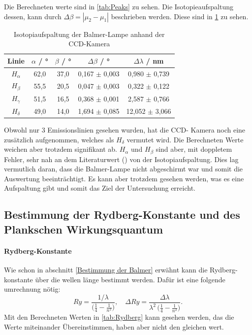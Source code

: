 Die Berechneten werte sind in \cref{tab:Peaks} zu sehen.
Die Isotopieaufspaltung dessen, kann durch 
$\Delta\beta = |\mu_2 - \mu_1|$
beschrieben werden. 
Diese sind in \cref{tab:Isotopiaufspaltung} zu sehen.
\begin{table}[htbp]
    \centering
    \begin{tabular}{|c|c|c|c|c|}
        Linie & $\alpha$ / ° & $\beta$ / ° & $\Delta\beta$ / ° & $\Delta\lambda$ / nm \\
        \hline
        $H_\alpha$& 62,0 & 37,0 & 0,167 $\pm$ 0,003 & 0,980 $\pm$ 0,739 \\
        $H_\beta$ & 55,5 & 20,5 & 0,047 $\pm$ 0,003 & 0,322 $\pm$ 0,122 \\
        $H_\gamma$ & 51,5 & 16,5 & 0,368 $\pm$ 0,001 & 2,587 $\pm$ 0,766 \\
        $H_\delta$ & 49,0 & 14,0 & 1,694 $\pm$ 0,085 & 12,052 $\pm$ 3,066 \\
    \end{tabular}
    \caption{Isotopiaufspaltung der Balmer-Lampe anhand der CCD-Kamera}
    \label{tab:Isotopiaufspaltung}
\end{table}
Obwohl nur 3 Emissionslinien gesehen wurden, hat die CCD- Kamera noch eine zusätzlich aufgenommen, welches als $H_\delta$ vermutet wird.
Die Berechneten Werte weichen aber trotzdem signifikant ab.
$H_\alpha$ und $H_\beta$ sind aber, mit doppletem Fehler, sehr nah an dem Literaturwert (\cite{Ulm}) von der Isotopiaufspaltung.
Dies lag vermutlich daran, dass die Balmer-Lampe nicht abgeschirmt war und somit die Auswertung beeinträchtigt. 
Es kann aber trotzdem gesehen werden, was es eine Aufspaltung gibt und somit das Ziel der Untersuchung erreicht.

\subsection{Bestimmung der Rydberg-Konstante und des Plankschen Wirkungsquantum}
\paragraph{Rydberg-Konstante} \label{Rydberg-konst}
Wie schon in abschnitt \ref{Bestimmung der Balmer} erwähnt kann die Rydberg-konstante über die wellen länge bestimmt werden.
Dafür ist eine folgende umrechnung nötig:
\begin{equation}
  Ry
  = \frac{1/\lambda}{\bigl(\tfrac{1}{4} - \tfrac{1}{n^{2}}\bigr)},
  \quad
  \Delta Ry
  = \frac{\Delta\lambda}{\lambda^{2}\,\bigl(\tfrac{1}{4} - \tfrac{1}{n^{2}}\bigr)}.
\end{equation}
Mit den Berechneten Werten in \cref{tab:Rydberg} kann gesehen werden, das die Werte miteinander Übereinstimmen, haben aber nicht den gleichen wert. 

